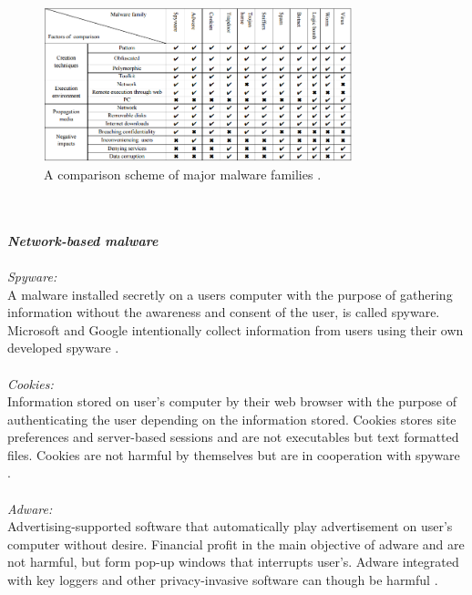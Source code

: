 \documentclass[12pt]{article} %
\begin{document}
\begin{figure}[H]
    \centering
    \includegraphics[width=0.8\textwidth]{family}
    \captionsetup{width=0.8\textwidth}
    \caption{A comparison scheme of major malware families \cite{Asurveyonmalware}.}
    \label{fig:family}
\end{figure}

\\ \\
\textbf{\emph{Network-based malware}}
\\ \\
\emph{Spyware:} \\
A malware installed secretly on a users computer with the purpose of gathering information without the awareness and consent of the user, is called spyware. Microsoft and Google intentionally collect information from users using their own developed spyware \cite{Asurveyonmalware}.\\ \\

\emph{Cookies:} \\
Information stored on user’s computer by their web browser with the purpose of authenticating the user depending on the information stored. Cookies stores site preferences and server-based sessions and are not executables but text formatted files. Cookies are not harmful by themselves but are in cooperation with spyware \cite{Asurveyonmalware}. \\ \\

\emph{Adware:} \\
Advertising-supported software that automatically play advertisement on user’s computer without desire. Financial profit in the main objective of adware and are not harmful, but form pop-up windows that interrupts user’s. Adware integrated with key loggers and other privacy-invasive software can though be harmful \cite{Asurveyonmalware}. \\ \\
\end{document}
